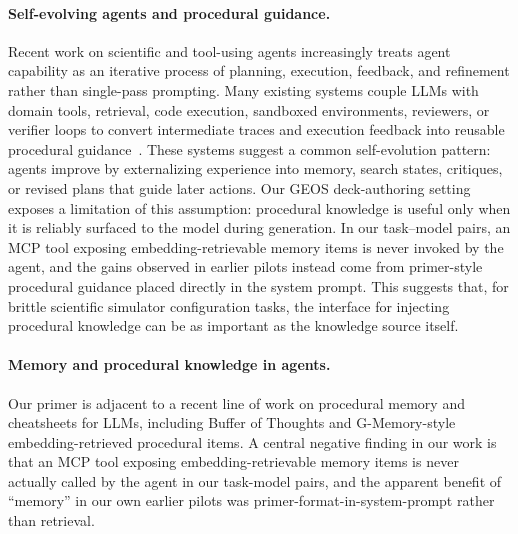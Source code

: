 \documentclass{article}
\begin{document}
\paragraph{Self-evolving agents and procedural guidance.}
Recent work on scientific and tool-using agents increasingly treats agent capability as an iterative process of planning, execution, feedback, and refinement rather than single-pass prompting. Many existing systems couple LLMs with domain tools, retrieval, code execution, sandboxed environments, reviewers, or verifier loops to convert intermediate traces and execution feedback into reusable procedural guidance~\citep{bran2024chemcrow,boiko2023coscientist,alber2025cellvoyager,lu2024aiscientist,zhang2026scinav,li2026agentflow,tang2026eigenagent,narayanan2024aviary}. These systems suggest a common self-evolution pattern: agents improve by externalizing experience into memory, search states, critiques, or revised plans that guide later actions. Our GEOS deck-authoring setting exposes a limitation of this assumption: procedural knowledge is useful only when it is reliably surfaced to the model during generation. In our task--model pairs, an MCP tool exposing embedding-retrievable memory items is never invoked by the agent, and the gains observed in earlier pilots instead come from primer-style procedural guidance placed directly in the system prompt. This suggests that, for brittle scientific simulator configuration tasks, the interface for injecting procedural knowledge can be as important as the knowledge source itself.

\paragraph{Memory and procedural knowledge in agents.}
Our primer is adjacent to a recent line of work on procedural memory and cheatsheets for LLMs, including Buffer of Thoughts \cite{yang2024bot} and G-Memory-style embedding-retrieved procedural items. A central negative finding in our work is that an MCP tool exposing embedding-retrievable memory items is never actually called by the agent in our task-model pairs, and the apparent benefit of ``memory'' in our own earlier pilots was primer-format-in-system-prompt rather than retrieval.
\end{document}
